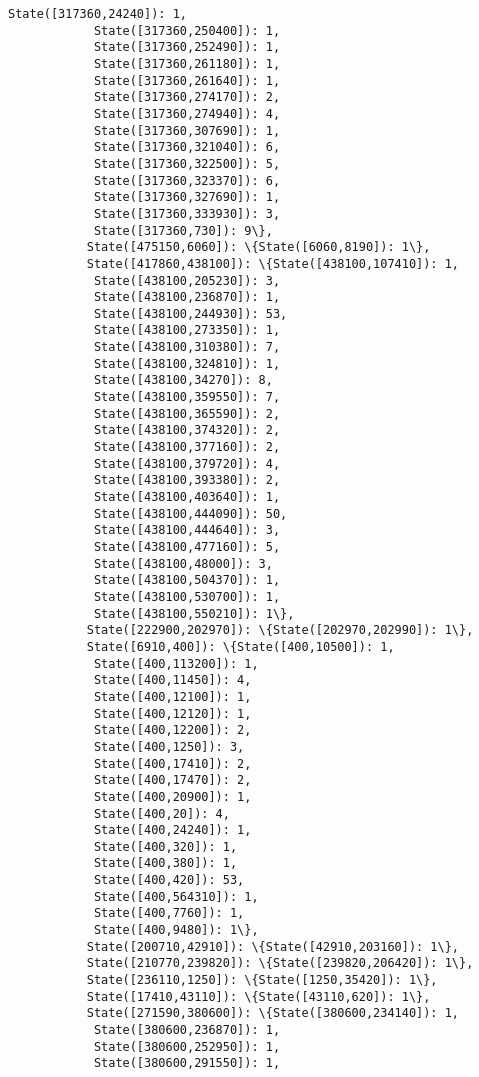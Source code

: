 \documentclass[11pt]{article}
\begin{document}
\begin{Verbatim}[commandchars=\\\{\}]
            State([317360,24240]): 1,
            State([317360,250400]): 1,
            State([317360,252490]): 1,
            State([317360,261180]): 1,
            State([317360,261640]): 1,
            State([317360,274170]): 2,
            State([317360,274940]): 4,
            State([317360,307690]): 1,
            State([317360,321040]): 6,
            State([317360,322500]): 5,
            State([317360,323370]): 6,
            State([317360,327690]): 1,
            State([317360,333930]): 3,
            State([317360,730]): 9\},
           State([475150,6060]): \{State([6060,8190]): 1\},
           State([417860,438100]): \{State([438100,107410]): 1,
            State([438100,205230]): 3,
            State([438100,236870]): 1,
            State([438100,244930]): 53,
            State([438100,273350]): 1,
            State([438100,310380]): 7,
            State([438100,324810]): 1,
            State([438100,34270]): 8,
            State([438100,359550]): 7,
            State([438100,365590]): 2,
            State([438100,374320]): 2,
            State([438100,377160]): 2,
            State([438100,379720]): 4,
            State([438100,393380]): 2,
            State([438100,403640]): 1,
            State([438100,444090]): 50,
            State([438100,444640]): 3,
            State([438100,477160]): 5,
            State([438100,48000]): 3,
            State([438100,504370]): 1,
            State([438100,530700]): 1,
            State([438100,550210]): 1\},
           State([222900,202970]): \{State([202970,202990]): 1\},
           State([6910,400]): \{State([400,10500]): 1,
            State([400,113200]): 1,
            State([400,11450]): 4,
            State([400,12100]): 1,
            State([400,12120]): 1,
            State([400,12200]): 2,
            State([400,1250]): 3,
            State([400,17410]): 2,
            State([400,17470]): 2,
            State([400,20900]): 1,
            State([400,20]): 4,
            State([400,24240]): 1,
            State([400,320]): 1,
            State([400,380]): 1,
            State([400,420]): 53,
            State([400,564310]): 1,
            State([400,7760]): 1,
            State([400,9480]): 1\},
           State([200710,42910]): \{State([42910,203160]): 1\},
           State([210770,239820]): \{State([239820,206420]): 1\},
           State([236110,1250]): \{State([1250,35420]): 1\},
           State([17410,43110]): \{State([43110,620]): 1\},
           State([271590,380600]): \{State([380600,234140]): 1,
            State([380600,236870]): 1,
            State([380600,252950]): 1,
            State([380600,291550]): 1,

\end{Verbatim}
\end{document}
